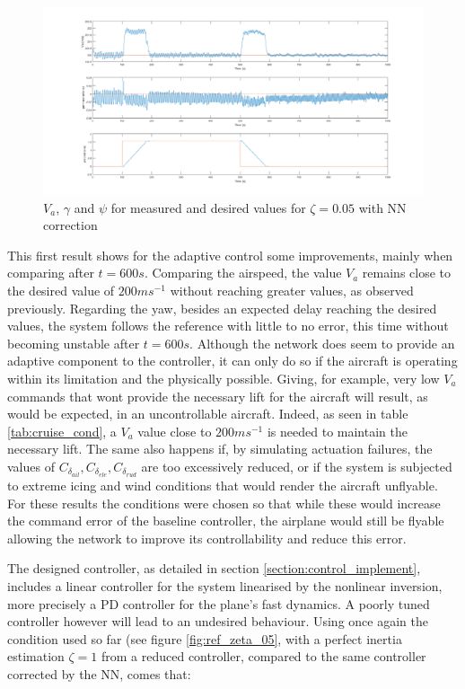 \begin{figure}[H]
\centering
\includegraphics[width=\textwidth]{Figures/Results/ref_zeta_005_NN.png}
\caption[Reference tracking for $\zeta=0.05$ with NN correction]{$V_a$, $\gamma$ and $\psi$ for measured and desired values for $\zeta=0.05$ with NN correction}
\label{fig:ref_zeta_005_NN}
\end{figure}

This first result shows for the adaptive control some improvements, mainly when comparing after $t=600s$. Comparing the airspeed, the value $V_a$ remains close to the desired value of $200ms^{-1}$ without reaching greater values, as observed previously. Regarding the yaw, besides an expected delay reaching the desired values, the system follows the reference with little to no error, this time without becoming unstable after $t=600s$. Although the network does seem to provide an adaptive component to the controller, it can only do so if the aircraft is operating within its limitation and the physically possible. Giving, for example, very low $V_a$ commands that wont provide the necessary lift for the aircraft will result, as would be expected, in an uncontrollable aircraft. Indeed, as seen in table \ref{tab:cruise_cond}, a $V_a$ value close to $200ms^{-1}$ is needed to maintain the necessary lift. The same also happens if, by simulating actuation failures, the values of $C_{\delta_{ail}}, C_{\delta_{ele}}, C_{\delta_{rud}}$ are too excessively reduced, or if the system is subjected to extreme icing and wind conditions that would render the aircraft unflyable. For these results the conditions were chosen so that while these would increase the command error of the baseline controller, the airplane would still be flyable allowing the network to improve its controllability and reduce this error.

The designed controller, as detailed in section \ref{section:control_implement}, includes a linear controller for the system linearised by the nonlinear inversion, more precisely a PD controller for the plane's fast dynamics. A poorly tuned controller however will lead to an undesired behaviour. Using once again the condition used so far (see figure \ref{fig:ref_zeta_05}, with a perfect inertia estimation $\zeta = 1$ from a reduced controller, compared to the same controller corrected by the NN, comes that:


